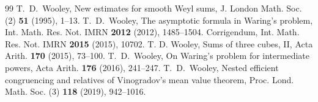 \documentclass[11pt,letterpaper]{article}
\theoremstyle{definition}
\begin{document}
\begin{thebibliography}{99}
 T.~D.~Wooley, New estimates for smooth Weyl sums, J. London Math. Soc. (2) \textbf{51} (1995), 1--13.
 T.~D.~Wooley, The asymptotic formula in Waring's problem, Int. Math. Res. Not. IMRN \textbf{2012} (2012), 1485--1504. Corrigendum, Int. Math. Res. Not. IMRN \textbf{2015} (2015), 10702.
 T. D. Wooley, Sums of three cubes, II, Acta Arith. \textbf{170} (2015), 73--100.
 T.~D.~Wooley, On Waring's problem for intermediate powers, Acta Arith. \textbf{176} (2016), 241--247.
 T.~D.~Wooley, Nested efficient congruencing and relatives of Vinogradov's mean value theorem, Proc. Lond. Math. Soc. (3) \textbf{118} (2019), 942--1016.
\end{thebibliography}
\end{document}
